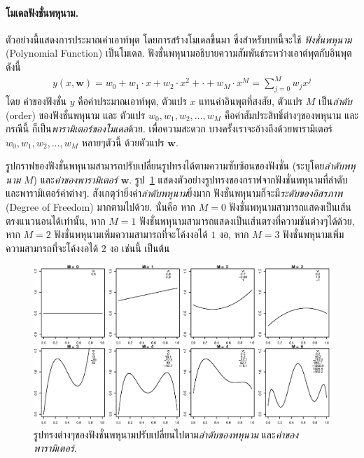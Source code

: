 \paragraph{โมเดลฟังชั่นพหุนาม.}
ตัวอย่างนี้แสดงการประมาณค่าเอาท์พุต โดยการสร้างโมเดลขึ้นมา
ซึ่งสำหรับบทนี้จะใช้ \textit{ฟังชั่นพหุนาม} (Polynomial Function) เป็นโมเดล.
%
ฟังชั่นพหุนามอธิบายความสัมพันธ์ระหว่างเอาต์พุตกับอินพุต ดังนี้
\begin{eqnarray}
   y(x, \mathbf{w}) = w_0 + w_1 \cdot x + w_2 \cdot x^2 + \cdot + w_M \cdot x^M = \sum_{j=0}^M w_j x^j
\label{eq: bg polynomial}
\end{eqnarray}
โดย ค่าของฟังชั่น $y$ คือค่าประมาณเอาท์พุต,
ตัวแปร $x$ แทนค่าอินพุตที่สงสัย,
ตัวแปร $M$ เป็น\textit{ลำดับ} (order) ของฟังชั่นพหุนาม 
และ ตัวแปร $w_0, w_1, w_2, \ldots, w_M$ คือค่าสัมประสิทธิ์ต่างๆของพหุนาม 
และกรณีนี้ ก็เป็น\textit{พารามิเตอร์ของโมเดล}ด้วย.
เพื่อความสะดวก บางครั้งเราจะอ้างถึงด้วยพารามิเตอร์ $w_0, w_1, w_2, \ldots, w_M$ หลายๆตัวนี้ ด้วยตัวแปร $\mathbf{w}$.

รูปกราฟของฟังชั่นพหุนามสามารถปรับเปลี่ยนรูปทรงได้ตามความซับซ้อนของฟังชั่น (ระบุโดย\textit{ลำดับพหุนาม} $M$) และ\textit{ค่าของพารามิเตอร์} $\mathbf{w}$.
รูป~\ref{fig: various shapes of polynomial} แสดงตัวอย่างรูปทรงของกราฟจากฟังชั่นพหุนามที่ลำดับและพารามิเตอร์ค่าต่างๆ.
สังเกตุว่ายิ่งค่า\textit{ลำดับพหุนาม}ยิ่งมาก ฟังชั่นพหุนามก็จะมี\textit{ระดับของอิสรภาพ} (Degree of Freedom) มากตามไปด้วย.
นั่นคือ หาก $M = 0$ ฟังชั่นพหุนามสามารถแสดงเป็นเส้นตรงแนวนอนได้เท่านั้น,
หาก $M = 1$ ฟังชั่นพหุนามสามารถแสดงเป็นเส้นตรงที่ความชันต่างๆได้ด้วย,
หาก $M = 2$ ฟังชั่นพหุนามเพิ่มความสามารถที่จะโค้งงอได้ $1$ งอ,
หาก $M = 3$ ฟังชั่นพหุนามเพิ่มความสามารถที่จะโค้งงอได้ $2$ งอ
เช่นนี้ เป็นต้น
%
\begin{figure}
\begin{center}
\includegraphics[width=5.5in]
{02Background/bgPolynomial.eps}
\end{center}
\caption{รูปทรงต่างๆของฟังชั่นพหุนามปรับเปลี่ยนไปตาม\textit{ลำดับของพหุนาม}
และ\textit{ค่าของพารามิเตอร์}.}
\label{fig: various shapes of polynomial}
\end{figure}
%

